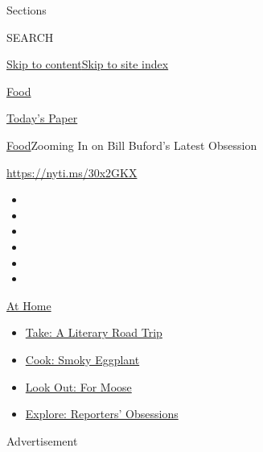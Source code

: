 Sections

SEARCH

\protect\hyperlink{site-content}{Skip to
content}\protect\hyperlink{site-index}{Skip to site index}

\href{https://www.nytimes.com/section/food}{Food}

\href{https://myaccount.nytimes.com/auth/login?response_type=cookie\&client_id=vi}{}

\href{https://www.nytimes.com/section/todayspaper}{Today's Paper}

\href{/section/food}{Food}\textbar{}Zooming In on Bill Buford's Latest
Obsession

\url{https://nyti.ms/30x2GKX}

\begin{itemize}
\item
\item
\item
\item
\item
\item
\end{itemize}

\href{https://www.nytimes.com/spotlight/at-home?action=click\&pgtype=Article\&state=default\&region=TOP_BANNER\&context=at_home_menu}{At
Home}

\begin{itemize}
\tightlist
\item
  \href{https://www.nytimes.com/2020/07/28/books/time-for-a-literary-road-trip.html?action=click\&pgtype=Article\&state=default\&region=TOP_BANNER\&context=at_home_menu}{Take:
  A Literary Road Trip}
\item
  \href{https://www.nytimes.com/2020/07/29/magazine/bored-with-your-home-cooking-some-smoky-eggplant-will-fix-that.html?action=click\&pgtype=Article\&state=default\&region=TOP_BANNER\&context=at_home_menu}{Cook:
  Smoky Eggplant}
\item
  \href{https://www.nytimes.com/2020/07/27/travel/moose-michigan-isle-royale.html?action=click\&pgtype=Article\&state=default\&region=TOP_BANNER\&context=at_home_menu}{Look
  Out: For Moose}
\item
  \href{https://www.nytimes.com/interactive/2020/at-home/even-more-reporters-editors-diaries-lists-recommendations.html?action=click\&pgtype=Article\&state=default\&region=TOP_BANNER\&context=at_home_menu}{Explore:
  Reporters' Obsessions}
\end{itemize}

Advertisement

